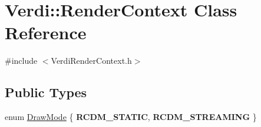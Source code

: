 \hypertarget{class_verdi_1_1_render_context}{\section{\-Verdi\-:\-:\-Render\-Context \-Class \-Reference}
\label{class_verdi_1_1_render_context}
}


{\ttfamily \#include $<$\-Verdi\-Render\-Context.\-h$>$}

\subsection*{\-Public \-Types}
\begin{DoxyCompactItemize}
\item 
enum \hyperlink{class_verdi_1_1_render_context_a57f01ede0284c624c24fc1660075fecc}{\-Draw\-Mode} \{ {\bfseries \-R\-C\-D\-M\-\_\-\-S\-T\-A\-T\-I\-C}, 
{\bfseries \-R\-C\-D\-M\-\_\-\-S\-T\-R\-E\-A\-M\-I\-N\-G}
 \}
\end{DoxyCompactItemize}
